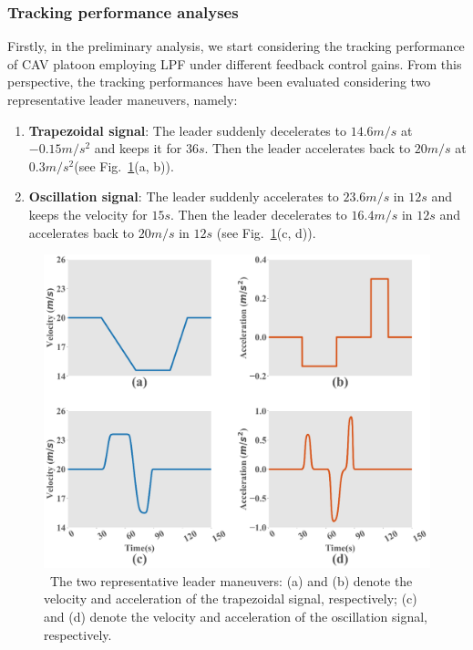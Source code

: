 \documentclass[a4paper]{cas-sc}
\begin{document}
\subsubsection{Tracking performance analyses}
\label{Section 5.2.1}

Firstly, in the preliminary analysis, we start considering the tracking performance of CAV platoon employing LPF under different feedback control gains. From this perspective, the tracking performances have been evaluated considering two representative leader maneuvers, namely:
\begin{enumerate}
  \item \textbf{Trapezoidal signal}: The leader suddenly decelerates to $14.6m/s$ at $ - 0.15m/{s^2}$ and keeps it for $36s$. Then the leader accelerates back to $20m/s$ at $ 0.3m/{s^2} $(see Fig.~\ref{fig3}(a, b)).
  \item \textbf{Oscillation signal}: The leader suddenly accelerates to $23.6m/s$ in $12s$ and keeps the velocity for $15s$. Then the leader decelerates to $16.4m/s$ in $12s$ and accelerates back to $20m/s$ in $12s$ (see Fig.~\ref{fig3}(c, d)).
\end{enumerate}

\begin{figure}
  \centering
  \includegraphics[width=14cm]{figs/fig3.png}
  \caption{~The two representative leader maneuvers: (a) and (b) denote the velocity and acceleration of the trapezoidal signal, respectively; (c) and (d) denote the velocity and acceleration of the oscillation signal, respectively.}
  \label{fig3}
\end{figure}
\end{document}
